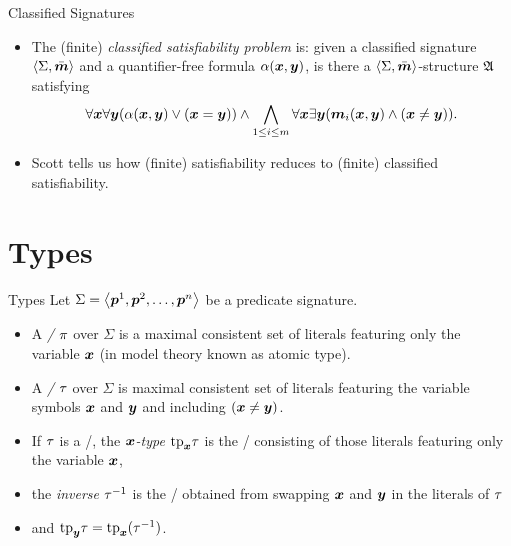 \documentclass{beamer}
\begin{document}
\begin{frame}{Classified Signatures}
\begin{itemize}
  \item
  The (finite) \emph{classified satisfiability problem} is: given a classified
  signature $\left\langle \Sigma,\bar{\bm{m}} \right\rangle$ and a quantifier-free formula $\alpha(\bm{x},\bm{y})$,
  is there a $\left\langle \Sigma,\bar{\bm{m}} \right\rangle$-structure $\mathfrak{A}$ satisfying
  \[
    \forall\bm{x}\forall\bm{y}(\alpha(\bm{x},\bm{y})\lor(\bm{x}=\bm{y})) \land
    \bigwedge_{1\leq i\leq m} \forall\bm{x}\exists\bm{y}
    (\bm{m}_i(\bm{x},\bm{y})\land(\bm{x}\neq\bm{y})).
  \]

  \item
  Scott tells us how (finite) satisfiability reduces to (finite) classified
  satisfiability.
\end{itemize}
\end{frame}

\section{Types}
\begin{frame}{Types}
Let $\Sigma = \left\langle \bm{p}^{1},\bm{p}^{2},\dots,\bm{p}^{n} \right\rangle$ be a predicate signature.
\begin{itemize}
\item A \emph{\onetype/} $\pi$ over $\Sigma$ is a maximal consistent set of
  literals featuring only the variable $\bm{x}$ (in model theory known as atomic
  type).
  \item A \emph{\twotype/} $\tau$ over $\Sigma$ is maximal consistent set of
  literals featuring the variable symbols $\bm{x}$ and $\bm{y}$ and including
  $(\bm{x} \neq \bm{y})$.
  \item If $\tau$ is a \twotype/, the \emph{$\bm{x}$-type} $\mathrm{tp}_{\bm{x}}\tau$ is the
  \onetype/ consisting of those literals featuring only the variable $\bm{x}$,
  \item the \emph{inverse} $\tau^{-1}$ is the \twotype/ obtained from swapping
  $\bm{x}$ and $\bm{y}$ in the literals of $\tau$ 
  \item and $\mathrm{tp}_{\bm{y}}\tau = \mathrm{tp}_{\bm{x}}(\tau^{-1})$.
  
\end{itemize}
\end{frame}
\end{document}
